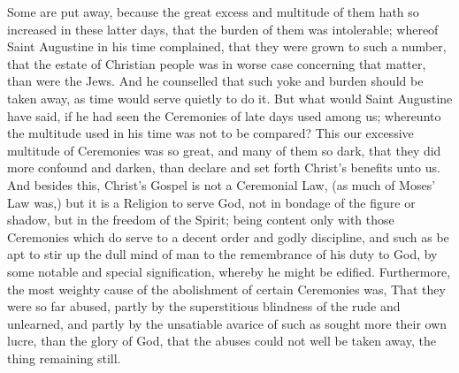 Some are put away, because the great excess and multitude of them hath so increased in these latter days, that the burden of them was intolerable; whereof Saint Augustine in his time complained, that they were grown to such a number, that the estate of Christian people was in worse case concerning that matter, than were the Jews. And he counselled that such yoke and burden should be taken away, as time would serve quietly to do it. But what would Saint Augustine have said, if he had seen the Ceremonies of late days used among us; whereunto the multitude used in his time was not to be compared? This our excessive multitude of Ceremonies was so great, and many of them so dark, that they did more confound and darken, than declare and set forth Christ's benefits unto us. And besides this, Christ's Gospel is not a Ceremonial Law, (as much of Moses' Law was,) but it is a Religion to serve God, not in bondage of the figure or shadow, but in the freedom of the Spirit; being content only with those Ceremonies which do serve to a decent order and godly discipline, and such as be apt to stir up the dull mind of man to the remembrance of his duty to God, by some notable and special signification, whereby he might be edified. Furthermore, the most weighty cause of the abolishment of certain Ceremonies was, That they were so far abused, partly by the superstitious blindness of the rude and unlearned, and partly by the unsatiable avarice of such as sought more their own lucre, than the glory of God, that the abuses could not well be taken away, the thing remaining still.

